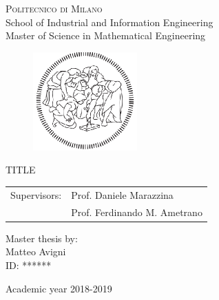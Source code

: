 \begin{titlepage}

	\begin{center}
		\normalsize 
			\textsc{Politecnico di Milano}\\
			School of Industrial and Information Engineering\\
			Master of Science in Mathematical Engineering\\

	\end{center}
	\vspace{.6cm}
	
	\begin{figure}[htpb]
		\centering
		\includegraphics[width=4cm]{Cover/polimi}
	\end{figure}
	\vspace{.6cm}
	
	\begin{center}
		\LARGE
			\textsc{TITLE}
	\end{center}
	\vspace{1.6cm}

	\begin{flushleft}
		\large
		\begin{tabular}{ll}
		Supervisors:    & Prof. Daniele Marazzina      \\
		             		   & Prof. Ferdinando M. Ametrano
		\end{tabular}
		\vspace{1cm}
	\end{flushleft}
	
	\begin{flushright}
		\large
		Master thesis by:\\
		Matteo Avigni\\
		ID: ******\\		
	\end{flushright}
	
	\vspace*{\fill}
	\begin{center}
		Academic year 2018-2019
	\end{center}
	
\end{titlepage}
